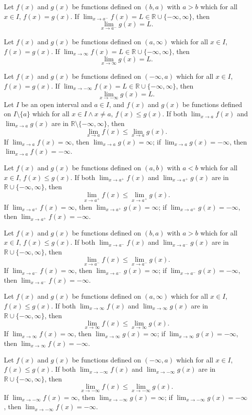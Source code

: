 \documentclass[a4paper,12pt]{report}
\begin{document}
Let $f(x)$ and $g(x)$ be functions defined on $(b,a)$ with $a>b$ which for all $x\in I$, $f(x)=g(x)$. If $\lim_{x\to a^-}f(x)=L\in\mathbb{R}\cup\{-\infty,\infty\}$, then
\[\lim_{x\to a^-}g(x)=L.\]

Let $f(x)$ and $g(x)$ be functions defined on $(a,\infty)$ which for all $x\in I$, $f(x)=g(x)$. If $\lim_{x\to\infty}f(x)=L\in\mathbb{R}\cup\{-\infty,\infty\}$, then
\[\lim_{x\to\infty}g(x)=L.\]

Let $f(x)$ and $g(x)$ be functions defined on $(-\infty,a)$ which for all $x\in I$, $f(x)=g(x)$. If $\lim_{x\to-\infty}f(x)=L\in\mathbb{R}\cup\{-\infty,\infty\}$, then
\[\lim_{x\to-\infty}g(x)=L.\]
Let $I$ be an open interval and $a\in I$, and $f(x)$ and $g(x)$ be functions defined on $I\setminus\{a\}$ which for all $x\in I\land x\neq a$, $f(x)\leq g(x)$. If both $\lim_{x\to a}f(x)$ and $\lim_{x\to a}g(x)$ are in $\mathbb{R}\setminus\{-\infty,\infty\}$, then
\[\lim_{x\to a}f(x)\leq\lim_{x\to a}g(x).\]
If $\lim_{x\to a}f(x)=\infty$, then $\lim_{x\to a}g(x)=\infty$; if $\lim_{x\to a}g(x)=-\infty$, then $\lim_{x\to a}f(x)=-\infty$.

Let $f(x)$ and $g(x)$ be functions defined on $(a,b)$ with $a<b$ which for all $x\in I$, $f(x)\leq g(x)$. If both $\lim_{x\to a^+}f(x)$ and $\lim_{x\to a^+}g(x)$ are in $\mathbb{R}\cup\{-\infty,\infty\}$, then
\[\lim_{x\to a^+}f(x)\leq\lim_{x\to a^+}g(x).\]
If $\lim_{x\to a^+}f(x)=\infty$, then $\lim_{x\to a^+}g(x)=\infty$; if $\lim_{x\to a^+}g(x)=-\infty$, then $\lim_{x\to a^+}f(x)=-\infty$.

Let $f(x)$ and $g(x)$ be functions defined on $(b,a)$ with $a>b$ which for all $x\in I$, $f(x)\leq g(x)$. If both $\lim_{x\to a^-}f(x)$ and $\lim_{x\to a^-}g(x)$ are in $\mathbb{R}\cup\{-\infty,\infty\}$, then
\[\lim_{x\to a^-}f(x)\leq\lim_{x\to a^-}g(x).\]
If $\lim_{x\to a^-}f(x)=\infty$, then $\lim_{x\to a^-}g(x)=\infty$; if $\lim_{x\to a^-}g(x)=-\infty$, then $\lim_{x\to a^-}f(x)=-\infty$.

Let $f(x)$ and $g(x)$ be functions defined on $(a,\infty)$ which for all $x\in I$, $f(x)\leq g(x)$. If both $\lim_{x\to\infty}f(x)$ and $\lim_{x\to\infty}g(x)$ are in $\mathbb{R}\cup\{-\infty,\infty\}$, then
\[\lim_{x\to\infty}f(x)\leq\lim_{x\to\infty}g(x).\]
If $\lim_{x\to\infty}f(x)=\infty$, then $\lim_{x\to\infty}g(x)=\infty$; if $\lim_{x\to\infty}g(x)=-\infty$, then $\lim_{x\to\infty}f(x)=-\infty$.

Let $f(x)$ and $g(x)$ be functions defined on $(-\infty,a)$ which for all $x\in I$, $f(x)\leq g(x)$. If both $\lim_{x\to-\infty}f(x)$ and $\lim_{x\to-\infty}g(x)$ are in $\mathbb{R}\cup\{-\infty,\infty\}$, then
\[\lim_{x\to-\infty}f(x)\leq\lim_{x\to-\infty}g(x).\]
If $\lim_{x\to-\infty}f(x)=\infty$, then $\lim_{x\to-\infty}g(x)=\infty$; if $\lim_{x\to-\infty}g(x)=-\infty$, then $\lim_{x\to-\infty}f(x)=-\infty$.
\end{document}
